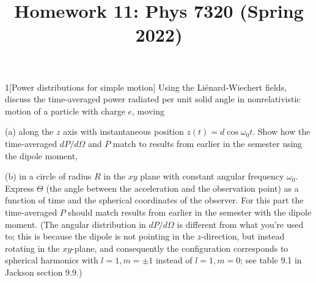 \documentclass[12pt]{article}
\title{Homework 11: Phys 7320 (Spring 2022)}
\begin{document}
\maketitle
\begin{problem}{1}[Power distributions for simple motion]
Using the Liénard-Wiechert fields, discuss the time-averaged power radiated per
unit solid angle in nonrelativistic motion of a particle with charge $e$, moving

(a) along the $z$ axis with instantaneous position $z(t)=d\cos\omega_0t$. Show
how the time-averaged $dP/d\Omega$ and $P$ match to results from earlier in the
semester using the dipole moment,

(b) in a circle of radius $R$ in the $xy$ plane with constant angular frequency
$\omega_0$. Express $\Theta$ (the angle between the acceleration and the
observation point) as a function of time and the spherical coordinates of the
observer. For this part the time-averaged $P$ should match results from earlier
in the semester with the dipole moment. (The angular distribution in
$dP/d\Omega$ is different from what you're used to; this is because the dipole
is not pointing in the $z$-direction, but instead rotating in the $xy$-plane,
and consequently the configuration corresponds to spherical harmonics with
$l=1,m=\pm1$ instead of $l=1,m=0$; see table 9.1 in Jackson section 9.9.)


\end{problem}
\end{document}
